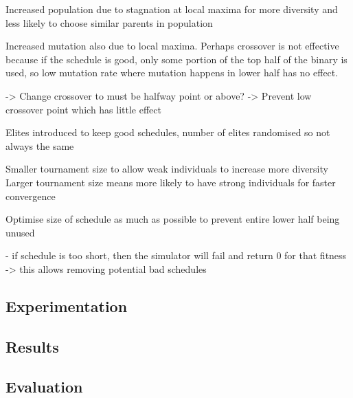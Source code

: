 \documentclass{article}
\begin{document}
Increased population due to stagnation at local maxima for more diversity and less likely to choose similar parents in population

Increased mutation also due to local maxima. Perhaps crossover is not effective because if the schedule is good, only some portion of the top half of the binary is used, so low mutation rate where mutation happens in lower half has no effect.

-> Change crossover to must be halfway point or above? -> Prevent low crossover point which has little effect

Elites introduced to keep good schedules, number of elites randomised so not always the same 

Smaller tournament size to allow weak individuals to increase more diversity
Larger tournament size means more likely to have strong individuals for faster convergence

Optimise size of schedule as much as possible to prevent entire lower half being unused


- if schedule is too short, then the simulator will fail and return 0 for that fitness -> this allows removing potential bad schedules

\subsection{Experimentation}


\subsection{Results}

\subsection{Evaluation}
\end{document}
